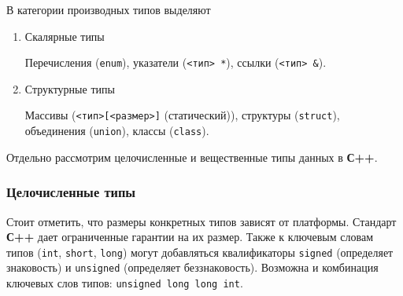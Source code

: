 В категории производных типов выделяют

\begin{enumerate}
    \def\labelenumi{\arabic{enumi})}
    \item
          Скалярные типы

          Перечисления (\texttt{enum}), указатели (\texttt{<тип> *}), ссылки (\texttt{<тип> \&}).
    \item
          Структурные типы

          Массивы (\texttt{<тип>[<размер>]} (статический)), структуры (\texttt{struct}), объединения (\texttt{union}), классы (\texttt{class}).
\end{enumerate}

Отдельно рассмотрим целочисленные и вещественные типы данных в
\textbf{С++}.

\subsubsection{Целочисленные типы}

Стоит отметить, что размеры конкретных типов зависят от платформы.
Стандарт \textbf{С++} дает ограниченные гарантии на их размер. Также к
ключевым словам типов (\texttt{int}, \texttt{short}, \texttt{long})
могут добавляться квалификаторы \texttt{signed} (определяет знаковость)
и \texttt{unsigned} (определяет беззнаковость). Возможна и комбинация
ключевых слов типов: \texttt{unsigned\ long\ long\ int}.


